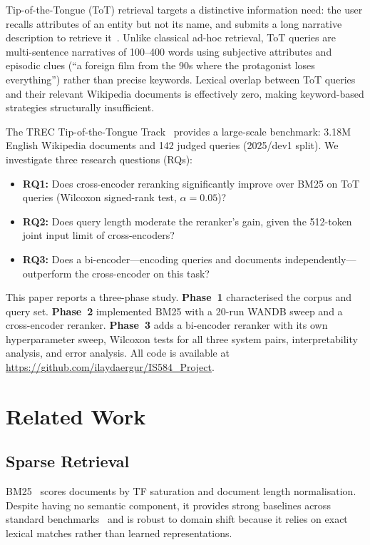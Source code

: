 \documentclass[conference]{IEEEtran}
\begin{document}
Tip-of-the-Tongue (ToT) retrieval targets a distinctive information need:
the user recalls attributes of an entity but not its name, and submits a long
narrative description to retrieve it~\cite{trec-tot}.
Unlike classical ad-hoc retrieval, ToT queries are multi-sentence narratives of
100--400 words using subjective attributes and episodic clues
(``a foreign film from the 90s where the protagonist loses everything'')
rather than precise keywords.
Lexical overlap between ToT queries and their relevant Wikipedia documents
is effectively zero, making keyword-based strategies structurally insufficient.

The TREC Tip-of-the-Tongue Track~\cite{trec-tot,bhatt2024} provides a large-scale
benchmark: 3.18M English Wikipedia documents and 142 judged queries (2025/dev1 split).
We investigate three research questions (RQs):
\begin{itemize}
  \item \textbf{RQ1:} Does cross-encoder reranking significantly improve over BM25
        on ToT queries (Wilcoxon signed-rank test, $\alpha=0.05$)?
  \item \textbf{RQ2:} Does query length moderate the reranker's gain,
        given the 512-token joint input limit of cross-encoders?
  \item \textbf{RQ3:} Does a bi-encoder---encoding queries and documents
        independently---outperform the cross-encoder on this task?
\end{itemize}

This paper reports a three-phase study.
\textbf{Phase~1} characterised the corpus and query set.
\textbf{Phase~2} implemented BM25 with a 20-run WANDB sweep and a cross-encoder reranker.
\textbf{Phase~3} adds a bi-encoder reranker with its own hyperparameter sweep,
Wilcoxon tests for all three system pairs, interpretability analysis, and error analysis.
All code is available at \url{https://github.com/ilaydaergur/IS584_Project}.

\section{Related Work}
\label{sec:related}

\subsection{Sparse Retrieval}
BM25~\cite{bm25} scores documents by TF saturation and document length normalisation.
Despite having no semantic component, it provides strong baselines across standard
benchmarks~\cite{lin2021} and is robust to domain shift because it relies on exact
lexical matches rather than learned representations.
\end{document}
